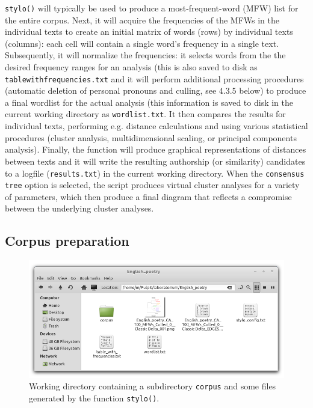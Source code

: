 \documentclass[11pt,a4paper]{article}
\def\underscore{\raisebox{-.8ex}{-}}
\def\code#1{{\tt #1}}
\begin{document}
\code{stylo()} will typically be used to produce a most-frequent-word
(MFW) list for the entire corpus. Next, it will acquire the frequencies
of the MFWs in the individual texts to create an initial matrix of
words (rows) by individual texts (columns): each cell will contain
a single word's frequency in a single text. Subsequently, it will
normalize the frequencies: it selects words from the the desired frequency
ranges for an analysis (this is also saved to disk as 
\code{table\underscore{}with\underscore{}frequencies.txt}
and it will perform additional processing procedures (automatic deletion
of personal pronouns and culling, see 4.3.5 below) to produce a final
wordlist for the actual analysis (this information is saved to disk
in the current working directory as \code{wordlist.txt}. It then
compares the results for individual texts, performing e.g. distance
calculations and using various statistical procedures (cluster analysis,
multidimensional scaling, or principal components analysis). Finally,
the function will produce graphical representations of distances between
texts and it will write the resulting authorship (or similarity) candidates
to a logfile (\code{results.txt}) in the current working directory.
When the \code{consensus tree} option is selected, the script produces
virtual cluster analyses for a variety of parameters, which then produce
a final diagram that reflects a compromise between the underlying
cluster analyses.


\subsection{Corpus preparation}

\begin{figure}
  \centering
  \includegraphics[width=0.85\linewidth]{img/stylo_corpus1.png}
  \caption{Working directory containing a subdirectory \code{corpus} and some files generated by the function \code{stylo()}.}
\end{figure}
\end{document}
